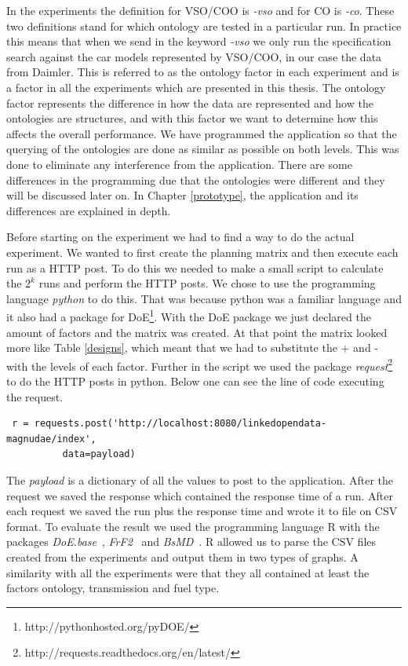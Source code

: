 \documentclass{llncs}
\begin{document}
In the experiments the definition for VSO/COO is \emph{-vso} and for
CO is \emph{-co}.  These two definitions stand for which ontology
are tested in a particular run. In practice this means that when we
send in the keyword \emph{-vso} we only run the specification search
against the car models represented by VSO/COO, in our case the data
from Daimler. This is referred to as the ontology factor in each
experiment and is a factor in all the experiments which are presented
in this thesis. The ontology factor represents the difference in how
the data are represented and how the ontologies are structures, and
with this factor we want to determine how this affects the overall
performance.  We have programmed the application so that the querying
of the ontologies are done as similar as possible on both levels. This
was done to eliminate any interference from the application. There are
some differences in the programming due that the ontologies were
different and they will be discussed later on.  In Chapter
\ref{prototype}, the application and its differences are explained in
depth.

Before starting on the experiment we had to find a way to do the
actual experiment. We wanted to first create the planning matrix and
then execute each run as a HTTP post. To do this we needed to make a
small script to calculate the $2^k$ runs and perform the HTTP
posts. We chose to use the programming language \emph{python} to do
this. That was because python was a familiar language and it also had
a package for DoE\footnote{http://pythonhosted.org/pyDOE/}. With the
DoE package we just declared the amount of factors and the matrix was
created. At that point the matrix looked more like Table
\ref{designs}, which meant that we had to substitute the + and - with
the levels of each factor.  Further in the script we used the package
\emph{request}\footnote{http://requests.readthedocs.org/en/latest/}
to do the HTTP posts in python. Below one can see the line of code
executing the request.

\scriptsize\begin{lstlisting}
 r = requests.post('http://localhost:8080/linkedopendata-magnudae/index', 
		  data=payload)
\end{lstlisting}
\normalsize

The \emph{payload} is a dictionary of all the values to post to the
application.  After the request we saved the response which contained
the response time of a run. After each request we saved the run plus
the response time and wrote it to file on CSV format. To evaluate the
result we used the programming language R with the packages
\emph{DoE.base}~\cite{DoEBase}, \emph{FrF2}~\cite{FrF2} and
\emph{BsMD}~\cite{BsMD}. R allowed us to parse the CSV files created
from the experiments and output them in two types of graphs.  A
similarity with all the experiments were that they all contained at
least the factors ontology, transmission and fuel type.
\end{document}
